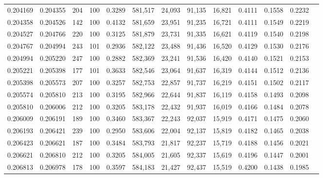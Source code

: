 \begin{tabular}{rrrrrrrrrrrrr}
0.204169 & 0.204355 &   204 & 100 &                                     0.3289 & 581,517 &  24,093 &  91,135 &  16,821 & 0.4111 & 0.1558 & 0.2232 \\
0.204358 & 0.204526 &   142 & 100 &                                     0.4132 & 581,659 &  23,951 &  91,235 &  16,721 & 0.4111 & 0.1549 & 0.2219 \\
0.204527 & 0.204766 &   220 & 100 &                                     0.3125 & 581,879 &  23,731 &  91,335 &  16,621 & 0.4119 & 0.1540 & 0.2198 \\
0.204767 & 0.204994 &   243 & 101 &                                     0.2936 & 582,122 &  23,488 &  91,436 &  16,520 & 0.4129 & 0.1530 & 0.2176 \\
0.204994 & 0.205220 &   247 & 100 &                                     0.2882 & 582,369 &  23,241 &  91,536 &  16,420 & 0.4140 & 0.1521 & 0.2153 \\
0.205221 & 0.205398 &   177 & 101 &                                     0.3633 & 582,546 &  23,064 &  91,637 &  16,319 & 0.4144 & 0.1512 & 0.2136 \\
0.205398 & 0.205573 &   207 & 100 &                                     0.3257 & 582,753 &  22,857 &  91,737 &  16,219 & 0.4151 & 0.1502 & 0.2117 \\
0.205574 & 0.205810 &   213 & 100 &                                     0.3195 & 582,966 &  22,644 &  91,837 &  16,119 & 0.4158 & 0.1493 & 0.2098 \\
0.205810 & 0.206006 &   212 & 100 &                                     0.3205 & 583,178 &  22,432 &  91,937 &  16,019 & 0.4166 & 0.1484 & 0.2078 \\
0.206009 & 0.206191 &   189 & 100 &                                     0.3460 & 583,367 &  22,243 &  92,037 &  15,919 & 0.4171 & 0.1475 & 0.2060 \\
0.206193 & 0.206421 &   239 & 100 &                                     0.2950 & 583,606 &  22,004 &  92,137 &  15,819 & 0.4182 & 0.1465 & 0.2038 \\
0.206423 & 0.206621 &   187 & 100 &                                     0.3484 & 583,793 &  21,817 &  92,237 &  15,719 & 0.4188 & 0.1456 & 0.2021 \\
0.206621 & 0.206810 &   212 & 100 &                                     0.3205 & 584,005 &  21,605 &  92,337 &  15,619 & 0.4196 & 0.1447 & 0.2001 \\
0.206813 & 0.206978 &   178 & 100 &                                     0.3597 & 584,183 &  21,427 &  92,437 &  15,519 & 0.4200 & 0.1438 & 0.1985 \\

\end{tabular}
